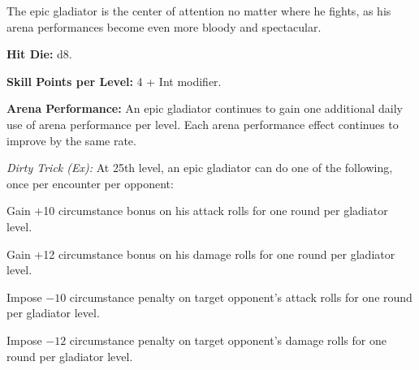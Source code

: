 
The epic gladiator is the center of attention no matter where he fights, as his arena performances become even more bloody and spectacular.

\textbf{Hit Die:} d8.

\textbf{Skill Points per Level:} 4 + Int modifier.

\textbf{Arena Performance:} An epic gladiator continues to gain one additional daily use of arena performance per level. Each arena performance effect continues to improve by the same rate.

\textit{Dirty Trick (Ex):} At 25th level, an epic gladiator can do one of the following, once per encounter per opponent:

\begin{itemize*}
\item Gain +10 circumstance bonus on his attack rolls for one round per gladiator level.
\item Gain +12 circumstance bonus on his damage rolls for one round per gladiator level.
\item Impose $-10$ circumstance penalty on target opponent's attack rolls for one round per gladiator level.
\item Impose $-12$ circumstance penalty on target opponent's damage rolls for one round per gladiator level.
\end{itemize*}

